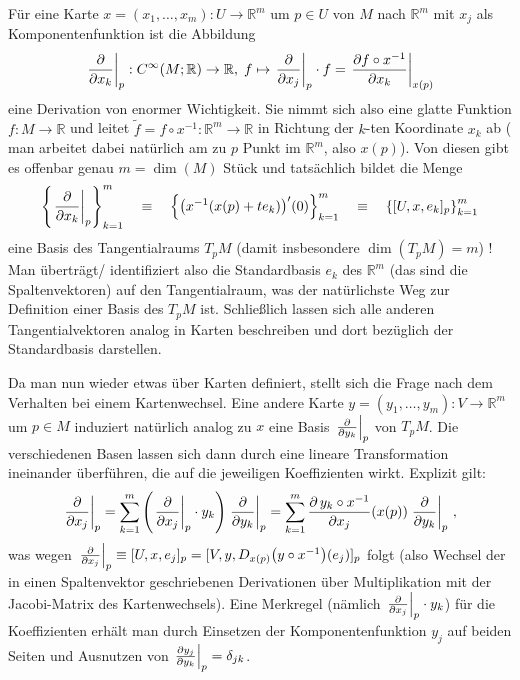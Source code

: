\documentclass[../H_Analysis_main.tex]{subfiles}
\begin{document}
\begin{bsp}\label{bsp:gaussbasis}
Für eine Karte $x = (x_1, \dots, x_m): U \rightarrow \mathbb{R}^m$ um $p \in U$ von $M$ nach $\mathbb{R}^m$ mit $x_j$ als Komponentenfunktion ist die Abbildung
\begin{equation}
\eval{\pdv{x_k}}_p: C^\infty(M; \mathbb{R}) \rightarrow \mathbb{R}, \; f \mapsto \eval{\pdv{x_j}}_p \cdot f = \eval{\pdv{f \circ x^{-1}}{x_k}}_{x(p)}%
\end{equation}
eine Derivation von enormer Wichtigkeit. Sie nimmt sich also eine glatte Funktion $f: M \rightarrow \mathbb{R}$ und leitet $\tilde{f} = f \circ x^{-1}: \mathbb{R}^m \rightarrow \mathbb{R}$ in Richtung der $k$-ten Koordinate $x_k$ ab (%
man arbeitet dabei natürlich am zu $p$ Punkt im $\mathbb{R}^m$, also $x(p)$). Von diesen gibt es offenbar genau $m = \dim(M)$ Stück und tatsächlich bildet die Menge
\begin{equation}
\qty{\eval{\pdv{x_k}}_p}_{k = 1}^m \quad \equiv \quad \qty{\qty(x^{-1}\qty(x(p) + t e_k))'(0)}_{k = 1}^m \quad \equiv \quad \qty{[U, x, e_k]_p}_{k = 1}^m
\end{equation}
eine Basis des Tangentialraums $T_p M$ (damit insbesondere $\dim(T_p M) = m$) ! Man überträgt/ identifiziert also die Standardbasis $e_k$ des $\mathbb{R}^m$ (das sind die Spaltenvektoren) auf den Tangentialraum, was der natürlichste Weg zur Definition einer Basis des $T_p M$ ist. Schließlich lassen sich alle anderen Tangentialvektoren analog in Karten beschreiben und dort bezüglich der Standardbasis darstellen.


Da man nun wieder etwas über Karten definiert, stellt sich die Frage nach dem Verhalten bei einem Kartenwechsel. Eine andere Karte $y = (y_1, \dots, y_m): V \rightarrow \mathbb{R}^m$ um $p \in M$ induziert natürlich analog zu $x$ eine Basis $\eval{\pdv{y_k}}_p$ von $T_p M$. Die verschiedenen Basen lassen sich dann durch eine lineare Transformation ineinander überführen, die auf die jeweiligen Koeffizienten wirkt. Explizit gilt:
\begin{equation}\label{eq:gausswechsel}
\eval{\pdv{x_j}}_p = \sum_{k = 1}^m \qty(\eval{\pdv{x_j}}_p \cdot y_k) \eval{\pdv{y_k}}_p = \sum_{k = 1}^m \pdv{\, y_k \circ x^{-1}}{x_j}\qty(x(p)) \eval{\pdv{y_k}}_p \, ,
\end{equation}
was wegen $\eval{\pdv{x_j}}_p \equiv [U, x, e_j]_p = [V, y, D_{x(p)} \qty(y \circ x^{-1})(e_j)]_p$ folgt (also Wechsel der in einen Spaltenvektor geschriebenen Derivationen über Multiplikation mit der Jacobi-Matrix des Kartenwechsels). Eine Merkregel (nämlich $\eval{\pdv{x_j}}_p \cdot y_k$) für die Koeffizienten erhält man durch Einsetzen der Komponentenfunktion $y_j$ auf beiden Seiten und Ausnutzen von $\eval{\pdv{y_j}{y_k}}_p = \delta_{jk}$.


\end{bsp}
\end{document}
